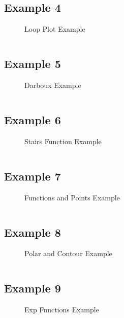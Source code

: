 \subsection{Example 4}
\begin{figure}[!htb]
    \centering
    
    \caption{Loop Plot Example}
    \label{fig:4-loop-to-plot-function}
\end{figure}
\inputminted{latex}{./Example/example_4.tex}
\newpage

\subsection{Example 5}
\begin{figure}[!htb]
    \centering
    
    \caption{Darboux Example}
    \label{fig:5-darboux-function}
\end{figure}
\inputminted{latex}{./Example/example_5.tex}
\newpage


\subsection{Example 6}
\begin{figure}[!htb]
    \centering
    
    \caption{Stairs Function Example}
    \label{fig:6-stairs-function}
\end{figure}
\inputminted{latex}{./Example/example_6.tex}
\newpage


\subsection{Example 7}
\begin{figure}[!htb]
    \centering
    
    \caption{Functions and Points Example}
    \label{fig:7-points-function}
\end{figure}
\inputminted{latex}{./Example/example_7.tex}
\newpage


\subsection{Example 8}
\begin{figure}[!htb]
    \centering
    
    \caption{Polar and Contour Example}
    \label{fig:polar-contour-plot}
\end{figure}
\inputminted{latex}{./Example/example_8.tex}
\newpage


\subsection{Example 9}
\begin{figure}[!htb]
    \centering
    
    \caption{Exp Functions Example}
    \label{fig:9-exp-functions}
\end{figure}
\inputminted{latex}{./Example/example_9.tex}
\newpage



